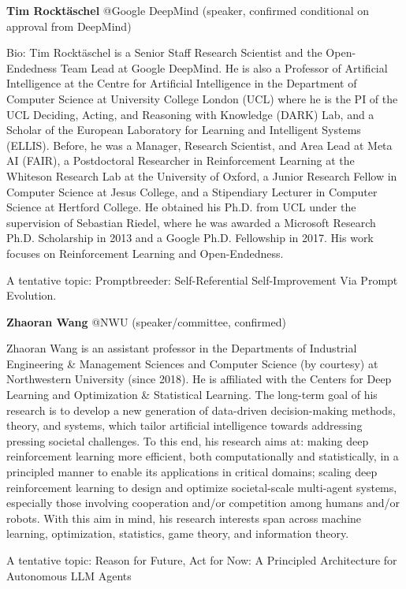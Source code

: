 \documentclass[10pt]{article} %
\begin{document}
{\bf Tim Rocktäschel} @Google DeepMind (speaker, confirmed conditional on approval from DeepMind)  
  
Bio: Tim Rocktäschel is a Senior Staff Research Scientist and the Open-Endedness Team Lead at Google DeepMind. He is also a Professor of Artificial Intelligence at the Centre for Artificial Intelligence in the Department of Computer Science at University College London (UCL) where he is the PI of the UCL Deciding, Acting, and Reasoning with Knowledge (DARK) Lab, and a Scholar of the European Laboratory for Learning and Intelligent Systems (ELLIS). Before, he was a Manager, Research Scientist, and Area Lead at Meta AI (FAIR), a Postdoctoral Researcher in Reinforcement Learning at the Whiteson Research Lab at the University of Oxford, a Junior Research Fellow in Computer Science at Jesus College, and a Stipendiary Lecturer in Computer Science at Hertford College. He obtained his Ph.D. from UCL under the supervision of Sebastian Riedel, where he was awarded a Microsoft Research Ph.D. Scholarship in 2013 and a Google Ph.D. Fellowship in 2017. His work focuses on Reinforcement Learning and Open-Endedness. 
  
A tentative topic: Promptbreeder: Self-Referential Self-Improvement Via Prompt Evolution.


{\bf Zhaoran Wang} @NWU (speaker/committee, confirmed)  

Zhaoran Wang is an assistant professor in the Departments of Industrial Engineering \& Management Sciences and Computer Science (by courtesy) at Northwestern University (since 2018). He is affiliated with the Centers for Deep Learning and Optimization \& Statistical Learning. The long-term goal of his research is to develop a new generation of data-driven decision-making methods, theory, and systems, which tailor artificial intelligence towards addressing pressing societal challenges. To this end, his research aims at: making deep reinforcement learning more efficient, both computationally and statistically, in a principled manner to enable its applications in critical domains; scaling deep reinforcement learning to design and optimize societal-scale multi-agent systems, especially those involving cooperation and/or competition among humans and/or robots. With this aim in mind, his research interests span across machine learning, optimization, statistics, game theory, and information theory.  

A tentative topic: Reason for Future, Act for Now: A Principled Architecture for Autonomous LLM Agents
\end{document}
